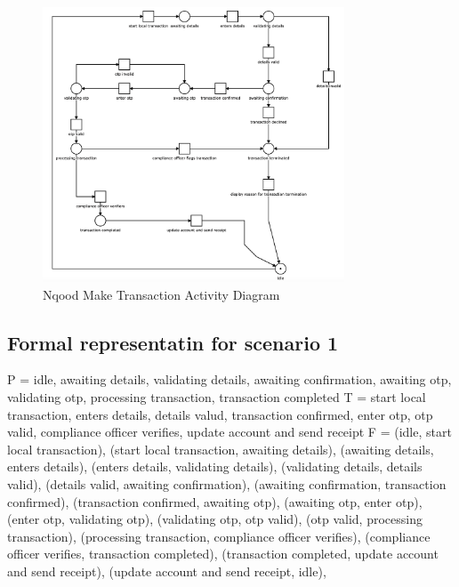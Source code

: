 \documentclass[a4paper]{report}
\begin{document}
\begin{figure}[h!]
    \centering
    \includegraphics[width=0.8\textwidth]{images/nqood-petri-net.png}
    \caption{Nqood Make Transaction Activity Diagram}
    \label{fig:nqood-petri-net}
\end{figure}

\subsection{Formal representatin for scenario 1}

P = {idle, awaiting details, validating details, awaiting confirmation, awaiting otp, validating otp, processing transaction, transaction completed}
\newline
T = {start local transaction, enters details, details valud, transaction confirmed, enter otp, otp valid, compliance officer verifies, update account and send receipt}
\newline
F = {
(idle, start local transaction),
(start local transaction, awaiting details),
(awaiting details, enters details),
(enters details, validating details),
(validating details, details valid),
(details valid, awaiting confirmation),
(awaiting confirmation, transaction confirmed),
(transaction confirmed, awaiting otp),
(awaiting otp, enter otp),
(enter otp, validating otp),
(validating otp, otp valid),
(otp valid, processing transaction),
(processing transaction, compliance officer verifies),
(compliance officer verifies, transaction completed),
(transaction completed, update account and send receipt),
(update account and send receipt, idle),
}
\newline
\end{document}
